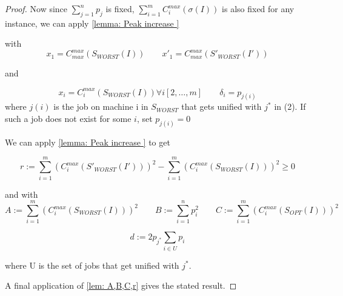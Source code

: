 \documentclass[11pt]{article}
\begin{document}
\begin{proof}
Now since $\sum_{j=1}^{n}p_j$ is fixed, $\sum_{i=1}^{m}C^{max}_i(\sigma(I))$ is also fixed for any instance, we can apply \ref{lemma: Peak increase }

with \[x_1 = C^{max}_{max}(S_{WORST}(I)) \qquad x'_1 = C^{max}_{max}(S'_{WORST}(I'))\]

and 

\[
x_i = C^{max}_i(S_{WORST}(I)) \forall i [2,\dots, m] \qquad \delta_i = p_{j(i)}
\]
where $j(i)$ is the job on machine i in $S_{WORST}$ that gets unified with $j^*$ in (2).
If such a job does not exist for some $i$, set $p_{j(i)} = 0$ 

We can apply \ref{lemma: Peak increase } to get 

\[
r:= \sum_{i=1}^m (C_i^{max}(S'_{WORST}(I')))^2 - \sum_{i=1}^m (C_i^{max}(S_{WORST}(I)))^2 \ge 0
\]

and with 
\[
A:= \sum_{i=1}^m (C_i^{max}(S_{WORST}(I)))^2 \qquad B:=\sum_{i=1}^{n}p_i^2 \qquad C:=\sum_{i=1}^m (C_i^{max}(S_{OPT}(I)))^2
\]

\[
d:= 2p_{j^*}\sum_{i\in U}p_{i}
\]

where U is the set of jobs that get unified with $j^*$. 

A final application of \ref{lem: A,B,C,r} gives the stated result.
\end{proof}
\end{document}
